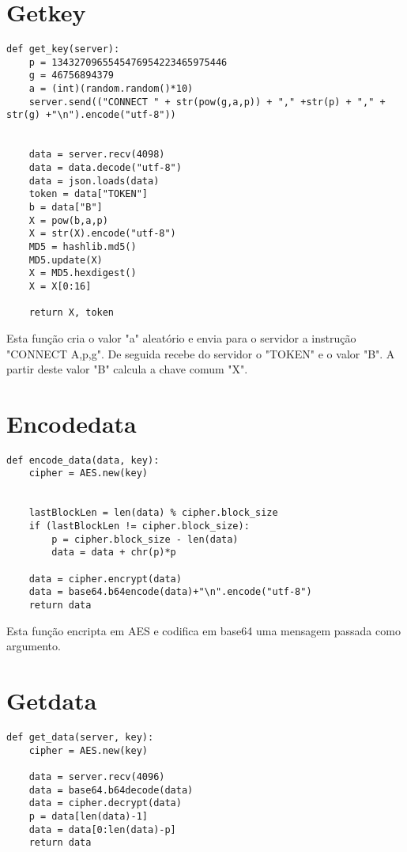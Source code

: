 \documentclass{report}
\begin{document}
\newpage

\section{Get\textunderscore key}
\begin{lstlisting}
def get_key(server):
	p = 1343270965545476954223465975446
	g = 46756894379
	a = (int)(random.random()*10)
	server.send(("CONNECT " + str(pow(g,a,p)) + "," +str(p) + "," + str(g) +"\n").encode("utf-8"))
	

	data = server.recv(4098)
	data = data.decode("utf-8")
	data = json.loads(data)
	token = data["TOKEN"]
	b = data["B"]
	X = pow(b,a,p)
	X = str(X).encode("utf-8")
	MD5 = hashlib.md5()
	MD5.update(X)
	X = MD5.hexdigest()
	X = X[0:16]
	
	return X, token

\end{lstlisting}

Esta função cria o valor "a" aleatório e envia para o servidor a instrução "CONNECT A,p,g".
De seguida recebe do servidor o "TOKEN" e o valor "B".
A partir deste valor "B" calcula a chave comum "X". 

\newpage

\section{Encode\textunderscore data}
\begin{lstlisting}
def encode_data(data, key):
	cipher = AES.new(key)
	

	lastBlockLen = len(data) % cipher.block_size
	if (lastBlockLen != cipher.block_size):
		p = cipher.block_size - len(data)
		data = data + chr(p)*p

	data = cipher.encrypt(data)
	data = base64.b64encode(data)+"\n".encode("utf-8")
	return data

\end{lstlisting}

Esta função encripta em AES e codifica em base64 uma mensagem passada como argumento.

\section{Get\textunderscore data}
\begin{lstlisting}
def get_data(server, key):
	cipher = AES.new(key)
	
	data = server.recv(4096)
	data = base64.b64decode(data)
	data = cipher.decrypt(data)
	p = data[len(data)-1]
	data = data[0:len(data)-p]
	return data

\end{lstlisting}
\end{document}
